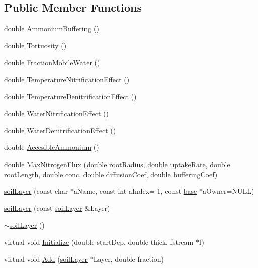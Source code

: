 \subsection*{Public Member Functions}
\begin{DoxyCompactItemize}
\item 
double \hyperlink{classsoil_layer_a31c1fdb870f18880b99105bab46ff88d}{AmmoniumBuffering} ()
\item 
double \hyperlink{classsoil_layer_adc0d1556be252d13f6facc7634757254}{Tortuosity} ()
\item 
double \hyperlink{classsoil_layer_a7e696db2177aef85f23ca3c21b076d93}{FractionMobileWater} ()
\item 
double \hyperlink{classsoil_layer_a6a9f57294317984233f216b9ce747878}{TemperatureNitrificationEffect} ()
\item 
double \hyperlink{classsoil_layer_afe9ca30f2da70f4708f2933f8971d7c1}{TemperatureDenitrificationEffect} ()
\item 
double \hyperlink{classsoil_layer_a68c0eb08bca115585e5abc4cee3c11b7}{WaterNitrificationEffect} ()
\item 
double \hyperlink{classsoil_layer_acbeec61312f9f83d6553a268e9dcbde2}{WaterDenitrificationEffect} ()
\item 
double \hyperlink{classsoil_layer_a879c1862803235bad6caa578cfb2989d}{AccesibleAmmonium} ()
\item 
double \hyperlink{classsoil_layer_a5685f314f5fc88763799e71fd34b8c75}{MaxNitrogenFlux} (double rootRadius, double uptakeRate, double rootLength, double conc, double diffusionCoef, double bufferingCoef)
\item 
\hyperlink{classsoil_layer_af5adc704be0dfcaca6210b6217242470}{soilLayer} (const char $\ast$aName, const int aIndex=-\/1, const \hyperlink{classbase}{base} $\ast$aOwner=NULL)
\item 
\hyperlink{classsoil_layer_a948fc6fe95c6f89f80c4bc77ff401d7c}{soilLayer} (const \hyperlink{classsoil_layer}{soilLayer} \&Layer)
\item 
\hyperlink{classsoil_layer_a7b1d8051966f9fbd7452b1c7dfbdc663}{$\sim$soilLayer} ()
\item 
virtual void \hyperlink{classsoil_layer_a9408711ac2943d5aff72bf3fc0e9e7c7}{Initialize} (double startDep, double thick, fstream $\ast$f)
\item 
virtual void \hyperlink{classsoil_layer_a6dcefc2b3278461493f73971d8885cb7}{Add} (\hyperlink{classsoil_layer}{soilLayer} $\ast$Layer, double fraction)
\item 

\end{DoxyCompactItemize}
